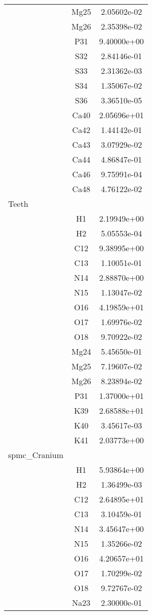 \begin{centering}
\begin{longtable}{l c c}
& Mg25 & 2.05602e-02 \\ 
& Mg26 & 2.35398e-02 \\ 
& P31 & 9.40000e+00 \\ 
& S32 & 2.84146e-01 \\ 
& S33 & 2.31362e-03 \\ 
& S34 & 1.35067e-02 \\ 
& S36 & 3.36510e-05 \\ 
& Ca40 & 2.05696e+01 \\ 
& Ca42 & 1.44142e-01 \\ 
& Ca43 & 3.07929e-02 \\ 
& Ca44 & 4.86847e-01 \\ 
& Ca46 & 9.75991e-04 \\ 
& Ca48 & 4.76122e-02 \\ 
\hline
Teeth & & \\
\hline
& H1 & 2.19949e+00 \\ 
& H2 & 5.05553e-04 \\ 
& C12 & 9.38995e+00 \\ 
& C13 & 1.10051e-01 \\ 
& N14 & 2.88870e+00 \\ 
& N15 & 1.13047e-02 \\ 
& O16 & 4.19859e+01 \\ 
& O17 & 1.69976e-02 \\ 
& O18 & 9.70922e-02 \\ 
& Mg24 & 5.45650e-01 \\ 
& Mg25 & 7.19607e-02 \\ 
& Mg26 & 8.23894e-02 \\ 
& P31 & 1.37000e+01 \\ 
& K39 & 2.68588e+01 \\ 
& K40 & 3.45617e-03 \\ 
& K41 & 2.03773e+00 \\ 
\hline
spmc\_Cranium & & \\
\hline
& H1 & 5.93864e+00 \\ 
& H2 & 1.36499e-03 \\ 
& C12 & 2.64895e+01 \\ 
& C13 & 3.10459e-01 \\ 
& N14 & 3.45647e+00 \\ 
& N15 & 1.35266e-02 \\ 
& O16 & 4.20657e+01 \\ 
& O17 & 1.70299e-02 \\ 
& O18 & 9.72767e-02 \\ 
& Na23 & 2.30000e-01 \\ 

\end{longtable}
\end{centering}
